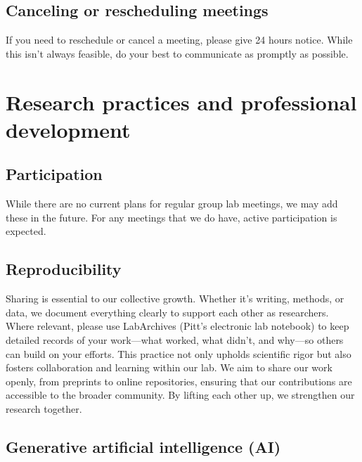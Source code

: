 \documentclass[
  letterpaper,
  DIV=11,
  numbers=noendperiod]{scrreprt}
\begin{document}
\subsection*{Canceling or rescheduling
meetings}\label{canceling-or-rescheduling-meetings}

If you need to reschedule or cancel a meeting, please give 24 hours
notice. While this isn't always feasible, do your best to communicate as
promptly as possible.

\section*{Research practices and professional
development}\label{research-practices-and-professional-development}


\subsection*{Participation}\label{participation}

While there are no current plans for regular group lab meetings, we may
add these in the future. For any meetings that we do have, active
participation is expected.

\subsection*{Reproducibility}\label{reproducibility}

Sharing is essential to our collective growth. Whether it's writing,
methods, or data, we document everything clearly to support each other
as researchers. Where relevant, please use LabArchives (Pitt's
electronic lab notebook) to keep detailed records of your work---what
worked, what didn't, and why---so others can build on your efforts. This
practice not only upholds scientific rigor but also fosters
collaboration and learning within our lab. We aim to share our work
openly, from preprints to online repositories, ensuring that our
contributions are accessible to the broader community. By lifting each
other up, we strengthen our research together.

\subsection*{Generative artificial intelligence
(AI)}\label{generative-artificial-intelligence-ai}
\end{document}

